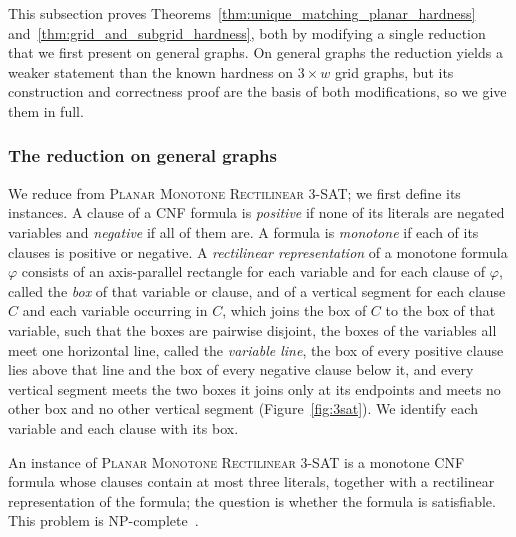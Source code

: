 \documentclass[a4paper,USenglish,thm-restate]{lipics-v2021}
\theoremstyle{problemstyle}
\begin{document}
This subsection proves Theorems~\ref{thm:unique_matching_planar_hardness}
and~\ref{thm:grid_and_subgrid_hardness}, both by modifying a single
reduction that we first present on general graphs. On general graphs the
reduction yields a weaker statement than the known hardness on $3\times w$
grid graphs, but its construction and correctness proof are the basis of
both modifications, so we give them in full.

\subsubsection{The reduction on general graphs}
\label{sec:planar-general}

We reduce from \textsc{Planar Monotone Rectilinear 3-SAT}; we first define
its instances.
A clause of a CNF formula is \emph{positive} if none of its literals are
negated variables and \emph{negative} if all of them are.
A formula is \emph{monotone} if each of its clauses is positive or negative.
A \emph{rectilinear representation} of a monotone formula $\varphi$ consists
of an axis-parallel rectangle for each variable and for each clause of
$\varphi$, called the \emph{box} of that variable or clause, and of a
vertical segment for each clause $C$ and each variable occurring in $C$,
which joins the box of $C$ to the box of that variable, such that the boxes
are pairwise disjoint, the boxes of the variables all meet one horizontal
line, called the \emph{variable line}, the box of every positive clause
lies above that line and the box of every negative clause below it, and
every vertical segment meets the two boxes it joins only at its endpoints
and meets no other box and no other vertical segment
(Figure~\ref{fig:3sat}). We identify each variable and each clause with its
box.

An instance of \textsc{Planar Monotone Rectilinear 3-SAT} is a monotone CNF
formula whose clauses contain at most three literals, together with a
rectilinear representation of the formula; the question is whether the formula is
satisfiable. This problem is \textsf{NP}-complete~\cite{deBergKhosravi2012}.
\end{document}
